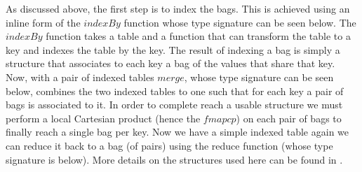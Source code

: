 As discussed above, the first step is to index the bags. This is achieved using
an inline form of the $indexBy$ function whose type
signature can be seen below. The $indexBy$ function
takes a table and a function that can transform the table to a key and indexes
the table by the key. The result of indexing a bag is simply a structure that
associates to each key a bag of the values that share that key. Now, with a pair of indexed tables
$merge$, whose type signature can be seen below,
combines the two indexed tables to one such that for each key a pair of bags is
associated to it. In order to complete reach a usable structure we must perform
a local Cartesian product (hence the $fmap cp$) on
each pair of bags to finally reach a single bag per key. Now we have a simple
indexed table again we can reduce it back to a bag (of pairs) using the reduce function
(whose type signature is below). More details on the structures used here can be
found in .


